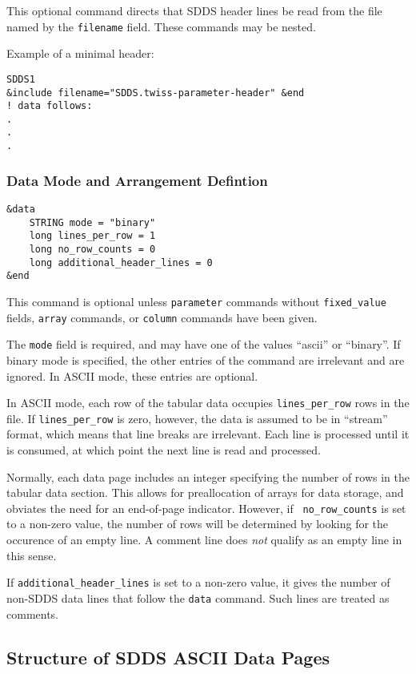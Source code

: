 \documentclass[11pt]{article}
\begin{document}
This optional command directs that SDDS header lines be read from the file named by the {\tt filename} field.  These
commands may be nested.

Example of a minimal header:
\begin{verbatim}
SDDS1
&include filename="SDDS.twiss-parameter-header" &end
! data follows:
.
.
.
\end{verbatim}

\subsubsection{Data Mode and Arrangement Defintion}
\begin{verbatim}
&data
    STRING mode = "binary"
    long lines_per_row = 1
    long no_row_counts = 0
    long additional_header_lines = 0
&end
\end{verbatim}

This command is optional unless {\tt parameter} commands without {\tt fixed\_value} fields, {\tt array} commands, or
{\tt column} commands have been given.

The {\tt mode} field is required, and may have one of the values ``ascii'' or ``binary''.  If binary mode is
specified, the other entries of the command are irrelevant and are ignored.  In ASCII mode, these entries are
optional.

In ASCII mode, each row of the tabular data occupies {\tt lines\_per\_row} rows in the file.  If {\tt lines\_per\_row}
is zero, however, the data is assumed to be in ``stream'' format, which means that line breaks are irrelevant.
Each line is processed until it is consumed, at which point the next line is read and processed.

Normally, each data page includes an integer specifying the number of rows in the tabular data section.  This allows
for preallocation of arrays for data storage, and obviates the need for an end-of-page indicator.  However, if {\tt
no\_row\_counts} is set to a non-zero value, the number of rows will be determined by looking for the occurence of an
empty line.  A comment line does {\em not} qualify as an empty line in this sense.

If {\tt additional\_header\_lines} is set to a non-zero value, it gives the number of non-SDDS data lines that
follow the {\tt data} command.  Such lines are treated as comments.

\subsection{Structure of SDDS ASCII Data Pages}
\end{document}
